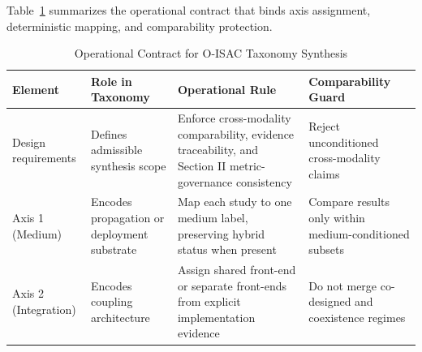 \documentclass[letterpaper,journal]{IEEEtran}
\begin{document}
Table~\ref{tab:taxonomy_contract} summarizes the operational contract that binds axis assignment, deterministic mapping, and comparability protection.

\begin{table}[!t]
    \caption{Operational Contract for O-ISAC Taxonomy Synthesis}
    \label{tab:taxonomy_contract}
    \centering
    \footnotesize
    \begin{tabularx}{\textwidth}{@{}>{\raggedright\arraybackslash}p{2.15cm} >{\raggedright\arraybackslash}X >{\raggedright\arraybackslash}X >{\raggedright\arraybackslash}X@{}}
        \toprule
        \textbf{Element}                                                                                          &
        \textbf{Role in Taxonomy}                                                                                 &
        \textbf{Operational Rule}                                                                                 &
        \textbf{Comparability Guard}                                                                                \\
        \midrule

        Design requirements                                                                                       &
        Defines admissible synthesis scope                                                                        &
        Enforce cross-modality comparability, evidence traceability, and Section II metric-governance consistency &
        Reject unconditioned cross-modality claims                                                                  \\

        Axis 1 (Medium)                                                                                           &
        Encodes propagation or deployment substrate                                                               &
        Map each study to one medium label, preserving hybrid status when present                                 &
        Compare results only within medium-conditioned subsets                                                      \\

        Axis 2 (Integration)                                                                                      &
        Encodes coupling architecture                                                                             &
        Assign shared front-end or separate front-ends from explicit implementation evidence                      &
        Do not merge co-designed and coexistence regimes                                                            \\


\end{tabularx}
\end{table}
\end{document}
